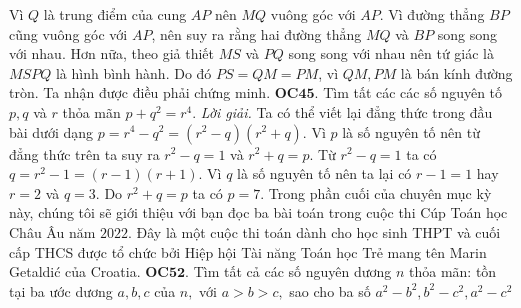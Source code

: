 \begin{multicols}{2}
\begin{figure}[H]
		\vspace*{-10pt}
	\end{figure} 
	Vì $Q$ là trung điểm của cung $AP$ nên $MQ$ vuông góc với $AP.$ Vì đường thẳng $BP$ cũng vuông góc với $AP$, nên suy ra rằng hai đường thẳng $MQ$ và $BP$ song song với nhau. Hơn nữa, theo giả thiết $MS$ và $PQ$ song song với nhau nên tứ giác là $MSPQ$ là  hình bình hành. Do đó $PS = QM = PM$, vì $QM, PM$ là bán kính đường tròn. Ta nhận được điều phải chứng minh.
	\vskip 0.1cm
	{\bf\color{cackithi} OC$\pmb{45.}$} Tìm tất các các số nguyên tố $p, q$ và $r$ thỏa mãn $p +q^2=r^4.$
	\vskip 0.1cm
	\textit{Lời giải.} 
	Ta có thể viết lại đẳng thức trong đầu bài dưới dạng $p = r^4 - q^2 = (r^2 - q)(r^2 + q).$
	Vì $p$ là số nguyên tố nên từ đẳng thức trên ta suy ra $r^2 - q = 1$ và $r^2 + q = p.$ Từ $r^2 - q = 1$ ta có $q = r^2 - 1 = (r - 1)(r + 1).$
	Vì $q$ là số nguyên tố nên ta  lại có $r - 1 = 1$ hay $r = 2$ và $q = 3.$ Do $r^2 + q = p$ ta có $p = 7.$
	\vskip 0.1cm	
	Trong phần cuối của chuyên mục kỳ này, chúng tôi sẽ giới thiệu với bạn đọc ba bài toán trong cuộc thi  Cúp Toán học Châu Âu năm $2022$. Đây là một cuộc thi toán dành cho học sinh THPT và cuối cấp THCS được tổ chức bởi Hiệp hội Tài năng Toán học Trẻ mang tên Marin Getaldić của Croatia.  
	\vskip 0.1cm
	{\bf\color{cackithi} OC$\pmb{52.}$} Tìm tất cả các số nguyên dương $n$ thỏa mãn: tồn tại ba ước dương $a, b, c$ của $n,$ với $a > b > c,$ sao cho ba số $a^2-b^2, b^2-c^2, a^2-c^2$ 

\end{multicols}
